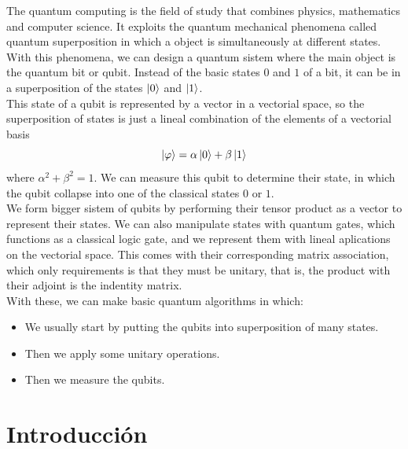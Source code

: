 \documentclass[a4paper]{article}
\numberwithin{equation}{section}
\begin{document}
The quantum computing is the field of study that combines physics, mathematics and computer science. It exploits the quantum mechanical phenomena called quantum superposition in which a object is simultaneously at different states. With this phenomena, we can design a quantum sistem where the main object is the quantum bit or qubit. Instead of the basic states $0$ and $1$ of a bit, it can be in a superposition of the states $\ket{0}$ and $\ket{1}$.\\
This state of a qubit is represented by a vector in a vectorial space, so the superposition of states is just a lineal combination of the elements of a vectorial basis
\begin{equation}
\ket{\varphi} = \alpha \ket{0} + \beta \ket{1}
\end{equation}
where $\alpha^2 + \beta^2 = 1$. We can measure this qubit to determine their state, in which the qubit collapse into one of the classical states $0$ or $1$.\\
We form bigger sistem of qubits by performing their tensor product as a vector to represent their states. We can also manipulate states with quantum gates, which functions as a classical logic gate, and we represent them with lineal aplications on the vectorial space. This comes with their corresponding matrix association, which only requirements is that they must be unitary, that is, the product with their adjoint is the indentity matrix.\\
\linebreak
With these, we can make basic quantum algorithms in which:
\begin{itemize}
\item We usually start by putting the qubits into superposition of many states.

\item Then we apply some unitary operations.

\item Then we measure the qubits.
\end{itemize}


\newpage

\tableofcontents

\newpage


\section{Introducción}
\end{document}
